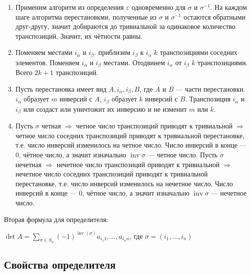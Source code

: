 \documentclass[twoside]{book}
\DeclareMathOperator{\inv}{inv}
\begin{document}
\begin{enumerate}
    \item Применим алгоритм из определения \(\varepsilon\) одновременно для \(\sigma\) и \(\sigma^{-1}\). На каждом шаге алгоритма перестановкми, полученные из \(\sigma\) и \(\sigma^{-1}\) остаются обратными друг-другу, значит добираются до тривиальной за одинаковое количество транспозиций. Значит, их чётности равны.
    \item Поменяем местами \(i_\alpha\) и \(i_\beta\). приблизим \(i_\beta\) к \(i_\alpha\) \(k\) транспозициями соседних элементов. Поменяем \(i_\alpha\) и \(i_\beta\) местами. Отодвинем \(i_\alpha\) от \(i_\beta\) \(k\) транспозициями. Всего \(2k + 1\) транспозиций.
    \item Пусть перестановка имеет вид \(A, i_\alpha, i_\beta, B\), где \(A\) и \(B\) --- части перестановки. \(i_\alpha\) образует \(m\) инверсий с \(A\), \(i_\beta\) образует \(k\) инверсий с \(B\). Транспозиция  \(i_\alpha\) и \(i_\beta\) или создаст или уничтожит их инверсию и не изменит \(m\) или \(k\).
    \item  Пусть \(\sigma\) четная \(\Rightarrow\) четное число транспозиций приводят к тривиальной \(\Rightarrow\) четное число соседних транспозиций приводят к тривиальной перестановке, т.е. число инверсий изменилось на четное число. Число инверсий в конце --- 0, чётное число, а значит изначально \(\inv \sigma\) --- четное число. Пусть \(\sigma\) нечетная \(\Rightarrow\) нечетное число транспозиций приводят к тривиальной \(\Rightarrow\) нечетное число соседних транспозиций приводят к тривиальной перестановке, т.е. число инверсий изменилось на нечетное число. Число инверсий в конце --- 0, чётное число, а значит изначально \(\inv \sigma\) --- нечетное число.
\end{enumerate}

Вторая формула для определителя:

\(\det A = \sum\limits_{\sigma \in S_n} (-1)^{\inv(\sigma)} a_{i_1 1}, \ldots, a_{i_n n}\), где \(\sigma = (i_1, \ldots, i_n)\)

\subsection{Свойства определителя}
\end{document}
